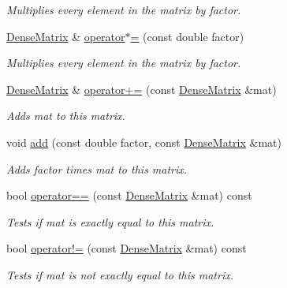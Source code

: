 \begin{DoxyCompactItemize}
\begin{DoxyCompactList}\small\item\em Multiplies every element in the matrix by {\ttfamily factor}. \end{DoxyCompactList}\item 
\mbox{\hyperlink{classfemus_1_1_dense_matrix}{Dense\+Matrix}} \& \mbox{\hyperlink{classfemus_1_1_dense_matrix_a748804467957e01dfc7a51dc8edefb8f}{operator$\ast$=}} (const double factor)
\begin{DoxyCompactList}\small\item\em Multiplies every element in the matrix by {\ttfamily factor}. \end{DoxyCompactList}\item 
\mbox{\hyperlink{classfemus_1_1_dense_matrix}{Dense\+Matrix}} \& \mbox{\hyperlink{classfemus_1_1_dense_matrix_adaadf49cb5433b9211287fad5e5857df}{operator+=}} (const \mbox{\hyperlink{classfemus_1_1_dense_matrix}{Dense\+Matrix}} \&mat)
\begin{DoxyCompactList}\small\item\em Adds {\ttfamily mat} to this matrix. \end{DoxyCompactList}\item 
void \mbox{\hyperlink{classfemus_1_1_dense_matrix_a3268040014359267e8d2fb9fbf187dac}{add}} (const double factor, const \mbox{\hyperlink{classfemus_1_1_dense_matrix}{Dense\+Matrix}} \&mat)
\begin{DoxyCompactList}\small\item\em Adds {\ttfamily factor} times {\ttfamily mat} to this matrix. \end{DoxyCompactList}\item 
bool \mbox{\hyperlink{classfemus_1_1_dense_matrix_a7d005d3213672a2e7e34fe7c4203881e}{operator==}} (const \mbox{\hyperlink{classfemus_1_1_dense_matrix}{Dense\+Matrix}} \&mat) const
\begin{DoxyCompactList}\small\item\em Tests if {\ttfamily mat} is exactly equal to this matrix. \end{DoxyCompactList}\item 
bool \mbox{\hyperlink{classfemus_1_1_dense_matrix_abe105648cbb9266ed37d9779ac0ecc57}{operator!=}} (const \mbox{\hyperlink{classfemus_1_1_dense_matrix}{Dense\+Matrix}} \&mat) const
\begin{DoxyCompactList}\small\item\em Tests if {\ttfamily mat} is not exactly equal to this matrix. \end{DoxyCompactList}\item 

\end{DoxyCompactItemize}
